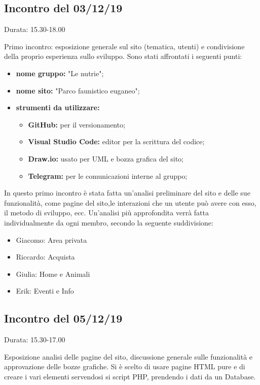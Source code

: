 \subsection{Incontro del 03/12/19}
    Durata: 15.30-18.00

    Primo incontro: esposizione generale sul sito (tematica, utenti) e condivisione della proprio esperienza sullo sviluppo.
    Sono stati affrontati i seguenti punti:
    
    \begin{itemize}
        \item \textbf{nome gruppo:} "Le nutrie"; 
        \item \textbf{nome sito:} "Parco faunistico euganeo"; 
        \item \textbf{strumenti da utilizzare:}
            \begin{itemize}
                \item \textbf{GitHub:} per il versionamento; 
                \item \textbf{Visual Studio Code:} editor per la scrittura del codice; 
                \item \textbf{Draw.io:} usato per UML e bozza grafica del sito;
                \item \textbf{Telegram:} per le comunicazioni interne al gruppo;
            \end{itemize}
    \end{itemize}

    In questo primo incontro è stata fatta un'analisi preliminare del sito e delle sue funzionalità, come pagine del sito,le interazioni che un utente può avere con esso, il metodo di sviluppo, ecc.
    Un'analisi più approfondita verrà fatta individualmente da ogni membro, secondo la seguente suddivisione:
    \begin{itemize}
        \item Giacomo: Area privata
        \item Riccardo: Acquista
        \item Giulia: Home e Animali
        \item Erik: Eventi e Info
    \end{itemize}

\subsection{Incontro del 05/12/19}
    Durata: 15.30-17.00

    Esposizione analisi delle pagine del sito, discussione generale sulle funzionalità e approvazione delle bozze grafiche.
    Si è scelto di usare pagine HTML pure e di creare i vari elementi servendosi si script PHP, prendendo i dati da un Database.

